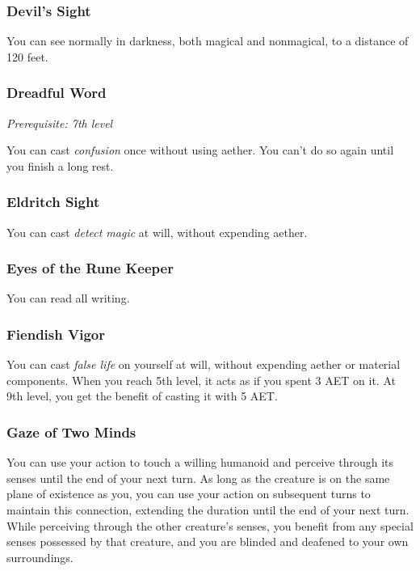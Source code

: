 \subsubsection{Devil's Sight}

You can see normally in darkness, both magical and nonmagical, to a distance of 120 feet.

\subsubsection{Dreadful Word}

\textit{Prerequisite: 7th level}

You can cast \textit{confusion} once without using aether. You can't do so again until you finish a long rest.

\subsubsection{Eldritch Sight}

You can cast \textit{detect magic} at will, without expending aether.

\subsubsection{Eyes of the Rune Keeper}

You can read all writing.

\subsubsection{Fiendish Vigor}

You can cast \textit{false life} on yourself at will, without expending aether or material components. When you reach 5th level, it acts as if you spent 3 AET on it. At 9th level, you get the benefit of casting it with 5 AET.

\subsubsection{Gaze of Two Minds}

You can use your action to touch a willing humanoid and perceive through its senses until the end of your next turn. As long as the creature is on the same plane of existence as you, you can use your action on subsequent turns to maintain this connection, extending the duration until the end of your next turn. While perceiving through the other creature's senses, you benefit from any special senses possessed by that creature, and you are blinded and deafened to your own surroundings.

